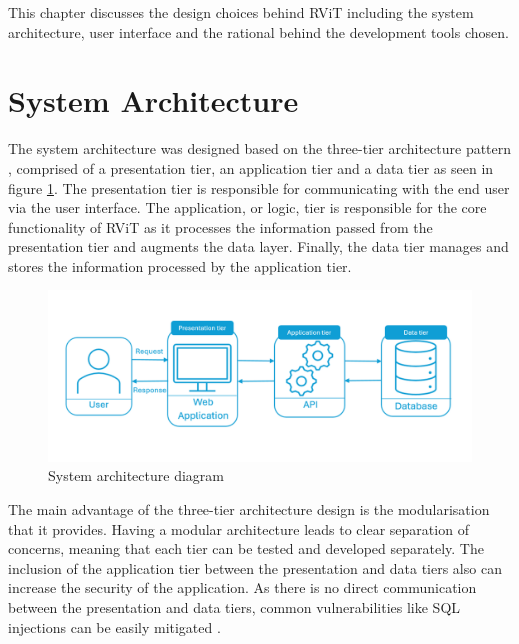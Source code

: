 \documentclass[l4proj.tex]{subfiles}
\begin{document}
    

This chapter discusses the design choices behind RViT including the system architecture, user interface and the rational behind the development tools chosen. 

\section{System Architecture}

The system architecture was designed based on the three-tier architecture pattern \cite{IBM3Tier}, comprised of a presentation tier, an application tier and a data tier as seen in figure \ref{fig:achitecture pattern}. The presentation tier is responsible for communicating with the end user via the user interface. The application, or logic, tier is responsible for the core functionality of RViT as it processes the information passed from the presentation tier and augments the data layer. Finally, the data tier manages and stores the information processed by the application tier.

\begin{figure}[h!]
\begin{center}
\includegraphics[scale=0.6]{dissertation/images/System Architecture.png}
\caption{System architecture diagram}
\label{fig:achitecture pattern} 
\end{center}
\end{figure}

The main advantage of the three-tier architecture design is the modularisation that it provides. Having a modular architecture leads to clear separation of concerns, meaning that each tier can be tested and developed separately. The inclusion of the application tier between the presentation and data tiers also can increase the security of the application. As there is no direct communication between the presentation and data tiers, common vulnerabilities like SQL injections can be easily mitigated \cite{IBM3Tier}.
\end{document}
